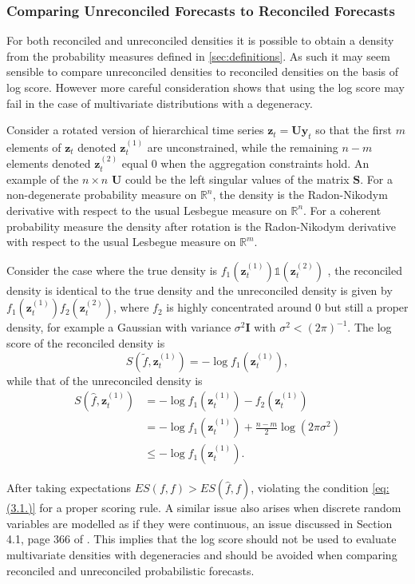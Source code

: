 \documentclass[a4paper, 11pt]{article}
\theoremstyle{theo}
\theoremstyle{definition}
\begin{document}
\subsubsection{Comparing Unreconciled Forecasts to Reconciled Forecasts}


For both reconciled and unreconciled densities it is possible to obtain a density from the probability measures defined in \ref{sec:definitions}.  As such it may seem sensible to compare unreconciled densities to reconciled densities on the basis of log score.  However more careful consideration shows that using the log score may fail in the case of multivariate distributions with a degeneracy.

Consider a rotated version of hierarchical time series $\bm{z}_t={\bm U}{\bm y}_t$ so that the first $m$ elements of $\bm{z}_t$ denoted $\bm{z}^(1)_t$ are unconstrained, while the remaining $n-m$ elements denoted $\bm{z}^(2)_t$ equal $0$ when the aggregation constraints hold. An example of the $n\times n$ ${\bm U}$ could be the left singular values of the matrix ${\bm S}$.  For a non-degenerate probability measure on $\mathbb{R}^n$, the density is the Radon-Nikodym derivative with respect to the usual Lesbegue measure on $\mathbb{R}^n$.  For a coherent probability measure the density after rotation is the Radon-Nikodym derivative with respect to the usual Lesbegue measure on $\mathbb{R}^m$.

Consider the case where the true density is $f_1(\bm{z}^{(1)}_t)\mathbb{1}\left({\bm{z}^{(2)}_t}\right)$ , the reconciled density is identical to the true density and the unreconciled density is given by $f_1(\bm{z}^{(1)}_t)f_2(\bm{z}^{(2)}_t)$, where $f_2$ is highly concentrated around $0$ but still a proper density, for example a Gaussian with variance $\sigma^2{\bm I}$ with $\sigma^2 < (2\pi)^{-1}$. The log score of the reconciled density is
$$
S\left(\tilde{f},\bm{z}^{(1)}_t\right) = -\log f_1\left(\bm{z}^{(1)}_t\right),
$$
while that of the unreconciled density is
\begin{align}
S\left(\hat{f},\bm{z}^{(1)}_t\right) &= -\log f_1(\bm{z}^{(1)}_t)-f_2(\bm{z}^{(1)}_t)\\
&= -\log f_1(\bm{z}^{(1)}_t)+\frac{n-m}{2}\log(2\pi\sigma^2)\\
&\leq-\log f_1(\bm{z}^{(1)}_t).
\end{align}


After taking expectations $ES(f,f) > ES(\hat{f},f)$, violating the condition \eqref{eq:(3.1.)} for a proper scoring rule.  A similar issue also arises when discrete random variables are modelled as if they were continuous, an issue discussed in Section 4.1, page 366 of \cite{Gneiting2007}. This implies that the log score should not be used to evaluate multivariate densities with degeneracies and should be avoided when comparing reconciled and unreconciled probabilistic forecasts.
\end{document}
